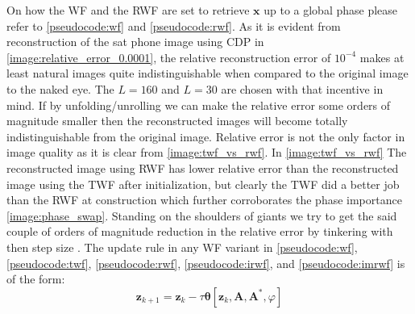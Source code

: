 On how the \ac{WF}\cite{Candes2014} and the \ac{RWF}\cite{Zhang2016} are set to retrieve $\boldsymbol{x}$ up to a global phase 
please refer to \cref{pseudocode:wf} and \cref{pseudocode:rwf}. As it is evident from reconstruction of the sat phone image 
using \ac{CDP} in \cref{image:relative_error_0.0001}, the relative reconstruction error of $10^{-4}$ 
makes at least natural images quite indistinguishable when compared to the original image to the naked eye. The 
$L=160$ and $L=30$ are chosen with that incentive in mind. If by unfolding/unrolling we can make 
the relative error some orders of magnitude smaller then the reconstructed images will become totally 
indistinguishable from the original image. Relative error is not the only factor in image quality as it is clear 
from \cref{image:twf_vs_rwf}. In \cref{image:twf_vs_rwf} The reconstructed image using \ac{RWF}\cite{Zhang2016} has lower relative error than the 
reconstructed image using the \ac{TWF}\cite{Chen2015} after initialization, but clearly the \ac{TWF}\cite{Chen2015} did a better job than the 
\ac{RWF}\cite{Zhang2016} at construction  which further corroborates the phase importance \cite{Oppenheim1979}\cite{Oppenheim1981}\cite{Shechtman2015}\ref{image:phase_swap}. 
Standing on the shoulders of giants \cite{Gregor2010} we try to get the said couple of orders of magnitude reduction in the relative error by 
tinkering with then step size  \cite{Gregor2010}. The update rule in any \ac{WF}\cite{Liu2019}\cite{Jaganathan2015} variant in \cref{pseudocode:wf}, \ref{pseudocode:twf}, \ref{pseudocode:rwf}, \ref{pseudocode:irwf}, and \ref{pseudocode:imrwf} is of the form:
\begin{equation*}
  \boldsymbol{z}_{k+1} = \boldsymbol{z}_k - \tau\boldsymbol{\theta}[\boldsymbol{z}_k,\boldsymbol{A},\boldsymbol{A^*},\varphi]
\end{equation*}
